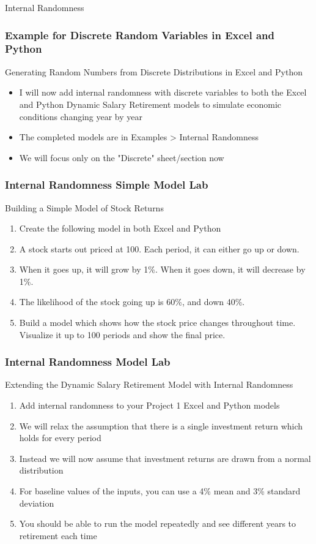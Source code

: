 \documentclass[handout, 11pt]{beamer}
\begin{document}
\begin{section}{Internal Randomness}
\begin{frame}
\frametitle{Example for Discrete Random Variables in Excel and Python}
{
\begin{block}{Generating Random Numbers from Discrete Distributions in Excel and Python}
\begin{itemize}
\item I will now add internal randomness with discrete variables to both the Excel and Python Dynamic Salary Retirement models to simulate economic conditions changing year by year
\item The completed models are in Examples > Internal Randomness
\item We will focus only on the "Discrete" sheet/section now
\end{itemize}
\end{block}
}
\end{frame}
\begin{frame}
\frametitle{Internal Randomness Simple Model Lab}
{
\begin{block}{Building a Simple Model of Stock Returns}
\begin{enumerate}
\item Create the following model in both Excel and Python
\item A stock starts out priced at 100. Each period, it can either go up or down.
\item When it goes up, it will grow by 1\%. When it goes down, it will decrease by 1\%.
\item The likelihood of the stock going up is 60\%, and down 40\%.
\item Build a model which shows how the stock price changes throughout time. Visualize it up to 100 periods and show the final price.
\end{enumerate}
\vfill
\end{block}
}
\label{labs:internal-randomness-simple-model-lab-1}
\end{frame}
\begin{frame}
\frametitle{Internal Randomness Model Lab}
{
\begin{block}{Extending the Dynamic Salary Retirement Model with Internal Randomness}
\begin{enumerate}
\item Add internal randomness to your Project 1 Excel and Python models
\item We will relax the assumption that there is a single investment return which holds for every period
\item Instead we will now assume that investment returns are drawn from a normal distribution
\item For baseline values of the inputs, you can use a 4\% mean and 3\% standard deviation
\item You should be able to run the model repeatedly and see different years to retirement each time
\end{enumerate}
\vfill
\end{block}
}
\label{labs:internal-randomness-model-lab-1}
\end{frame}
\end{section}
\end{document}
